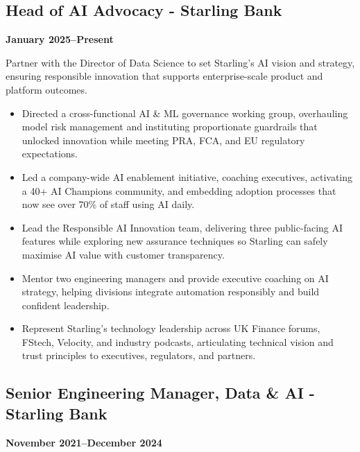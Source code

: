 \documentclass[a4paper]{scrartcl}
\begin{document}
\subsection*{Head of AI Advocacy - Starling Bank}
\textbf{January 2025--Present}

Partner with the Director of Data Science to set Starling's AI vision and strategy, ensuring responsible innovation that supports enterprise-scale product and platform outcomes.
\begin{itemize}
	\item Directed a cross-functional AI \& ML governance working group, overhauling model risk management and instituting proportionate guardrails that unlocked innovation while meeting PRA, FCA, and EU regulatory expectations.
	\item Led a company-wide AI enablement initiative, coaching executives, activating a 40+ AI Champions community, and embedding adoption processes that now see over 70\% of staff using AI daily.
		\item Lead the Responsible AI Innovation team, delivering three public-facing AI features while exploring new assurance techniques so Starling can safely maximise AI value with customer transparency.
	\item Mentor two engineering managers and provide executive coaching on AI strategy, helping divisions integrate automation responsibly and build confident leadership.
		\item Represent Starling's technology leadership across UK Finance forums, FStech, Velocity, and industry podcasts, articulating technical vision and trust principles to executives, regulators, and partners.
\end{itemize}

\subsection*{Senior Engineering Manager, Data \& AI - Starling Bank}
\textbf{November 2021--December 2024}
\end{document}
